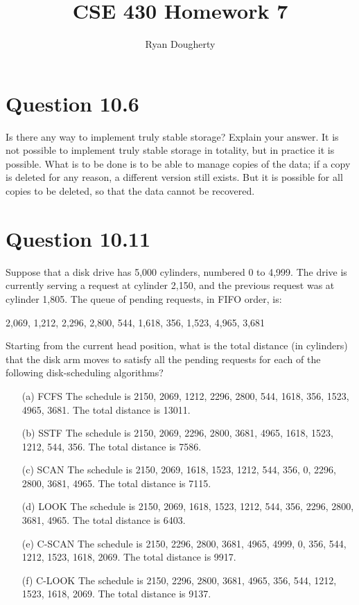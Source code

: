 \documentclass[12pt]{article}
\title{CSE 430 Homework 7}
\author{Ryan Dougherty}
\date{}                                           %
\begin{document}
\maketitle

\section*{Question 10.6}{\color{blue}Is there any way to implement truly stable storage? Explain your answer.} It is not possible to implement truly stable storage in totality, but in practice it is possible. What is to be done is to be able to manage copies of the data; if a copy is deleted for any reason, a different version still exists. But it is possible for all copies to be deleted, so that the data cannot be recovered.

\section*{Question 10.11}{\color{blue}Suppose that a disk drive has 5,000 cylinders, numbered 0 to 4,999. The drive is currently serving a request at cylinder 2,150, and the previous request was at cylinder 1,805. The queue of pending requests, in FIFO order, is:
\begin{center}
2,069, 1,212, 2,296, 2,800, 544, 1,618, 356, 1,523, 4,965, 3,681
\end{center}
Starting from the current head position, what is the total distance (in cylinders) that the disk arm moves to satisfy all the pending requests for each of the following disk-scheduling algorithms?
\begin{enumerate}
\item[(a)]FCFS {\color{black}The schedule is 2150, 2069, 1212, 2296, 2800, 544, 1618, 356, 1523, 4965, 3681. The total distance is 13011.
}
\item[(b)]SSTF {\color{black}The schedule is 2150, 2069, 2296, 2800, 3681, 4965, 1618, 1523, 1212, 544, 356. The total distance is 7586.
}
\item[(c)]SCAN {\color{black}The schedule is 2150, 2069, 1618, 1523, 1212, 544, 356, 0, 2296, 2800, 3681, 4965. The total distance is 7115.
}
\item[(d)]LOOK {\color{black}The schedule is 2150, 2069, 1618, 1523, 1212, 544, 356, 2296, 2800, 3681, 4965. The total distance is 6403.
}
\item[(e)]C-SCAN {\color{black}The schedule is 2150, 2296, 2800, 3681, 4965, 4999, 0, 356, 544, 1212, 1523, 1618, 2069. The total distance is 9917.
}
\item[(f)]C-LOOK {\color{black}The schedule is 2150, 2296, 2800, 3681, 4965, 356, 544, 1212, 1523, 1618, 2069. The total distance is 9137.
}
\end{enumerate}
}
\end{document}

